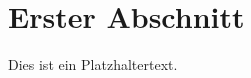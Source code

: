 \documentclass[naustrian]{univie-ling-handout}
\begin{document}
\maketitle

\section{Erster Abschnitt}

Dies ist ein Platzhaltertext.
\end{document}
